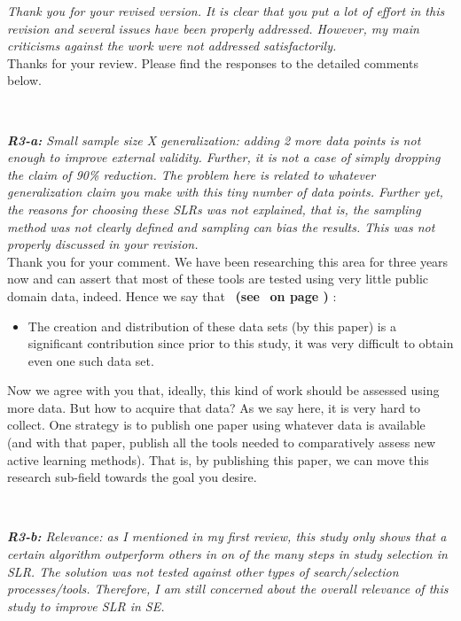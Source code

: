 \documentclass{svjour3}
\theoremstyle{break}
\newcommand{\review}[1]{{\textit{#1}}~\\}
\newcommand{\citeresp}[1]{
{\bf (see } \fcolorbox{black}{black!15}{
 \bf
  \scriptsize R-{#1}}~{\bf{on page \pageref{response:#1})}}
}
\begin{document}
\review{Thank you for your revised version. It is clear that you put a lot of effort in this revision and several issues have been properly addressed. However, my main criticisms against the work were not addressed satisfactorily.}

Thanks for your review. Please find the responses to the detailed comments below.
\par ~

\review{\textbf{R3-a:} Small sample size X generalization: adding 2 more data points is not enough to improve external validity. Further, it is not a case of simply dropping the claim of 90\% reduction. The problem here is related to whatever generalization claim you make with this tiny number of data points. Further yet, the reasons for choosing these SLRs was not explained, that is, the sampling method was not clearly defined and sampling can bias the results. This was not properly discussed in your revision.}

Thank you for your comment. We have been researching this area for three years now and can assert that most of these tools are tested using very little public domain data, indeed.  Hence we say that~\citeresp{3a}:
\begin{itemize}
\item
The creation and distribution of these data sets (by this paper) is a significant contribution since prior to this study, it was very difficult to obtain even one such data set.
\end{itemize}
Now we agree with you that, ideally,  this kind of work should be assessed using more data. But how to acquire that data? As we say here, it is very hard to collect. One strategy is to publish one paper using whatever data is available (and with that paper, publish all the tools needed to comparatively assess new active learning methods). That is, by publishing this paper, we can move this research sub-field towards the goal you desire.

\par ~

\review{\textbf{R3-b:} Relevance: as I mentioned in my first review, this study only shows that a certain algorithm outperform others in on of the many steps in study selection in SLR. The solution was not tested against other types of search/selection processes/tools. Therefore, I am still concerned about the overall relevance of this study to improve SLR in SE.}
\end{document}
